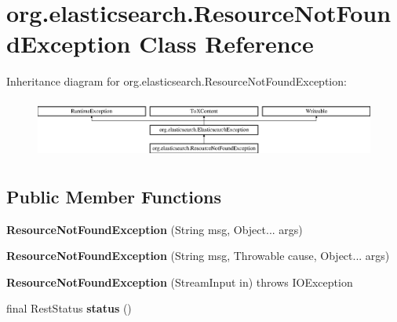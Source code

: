 \hypertarget{classorg_1_1elasticsearch_1_1_resource_not_found_exception}{}\section{org.\+elasticsearch.\+Resource\+Not\+Found\+Exception Class Reference}
\label{classorg_1_1elasticsearch_1_1_resource_not_found_exception}
Inheritance diagram for org.\+elasticsearch.\+Resource\+Not\+Found\+Exception\+:\begin{figure}[H]
\begin{center}
\leavevmode
\includegraphics[height=1.958042cm]{classorg_1_1elasticsearch_1_1_resource_not_found_exception}
\end{center}
\end{figure}
\subsection*{Public Member Functions}
\begin{DoxyCompactItemize}
\item 
\hypertarget{classorg_1_1elasticsearch_1_1_resource_not_found_exception_aaa015c41f6418a1a9557dbfd1d5e74c9}{}\label{classorg_1_1elasticsearch_1_1_resource_not_found_exception_aaa015c41f6418a1a9557dbfd1d5e74c9} 
{\bfseries Resource\+Not\+Found\+Exception} (String msg, Object... args)
\item 
\hypertarget{classorg_1_1elasticsearch_1_1_resource_not_found_exception_ae6bda67ddb33d499b3b0e4f7c06bf008}{}\label{classorg_1_1elasticsearch_1_1_resource_not_found_exception_ae6bda67ddb33d499b3b0e4f7c06bf008} 
{\bfseries Resource\+Not\+Found\+Exception} (String msg, Throwable cause, Object... args)
\item 
\hypertarget{classorg_1_1elasticsearch_1_1_resource_not_found_exception_ab9a7c4ff2912fe0af5cab2030f47f63c}{}\label{classorg_1_1elasticsearch_1_1_resource_not_found_exception_ab9a7c4ff2912fe0af5cab2030f47f63c} 
{\bfseries Resource\+Not\+Found\+Exception} (Stream\+Input in)  throws I\+O\+Exception 
\item 
\hypertarget{classorg_1_1elasticsearch_1_1_resource_not_found_exception_aa65491eba4e2c10f1e9f5bd60a4dbf15}{}\label{classorg_1_1elasticsearch_1_1_resource_not_found_exception_aa65491eba4e2c10f1e9f5bd60a4dbf15} 
final Rest\+Status {\bfseries status} ()
\end{DoxyCompactItemize}
